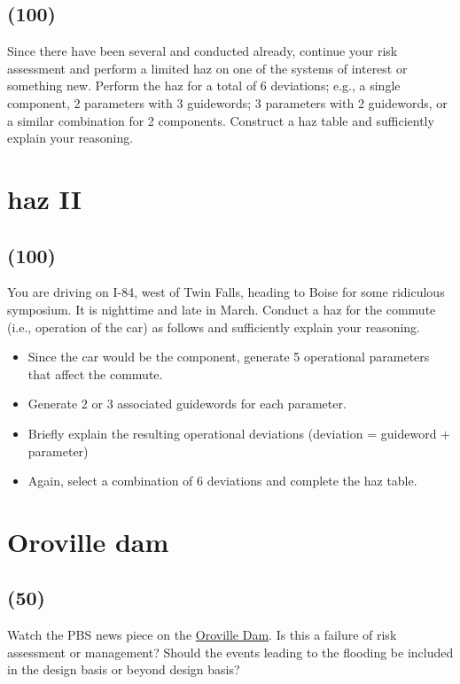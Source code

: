 \documentclass[11pt,a4paper]{article}
\newcommand{\acs}{\acrshort} %
\newcommand{\acsp}{\acrshortpl} %
\begin{document}
\subsection*{(100)}
Since there have been several \acsp{pha} and \acsp{fma} conducted already, continue your risk assessment and perform a limited \acs{haz} on one of the systems of interest or something new. Perform the \acs{haz} for a total of 6 deviations; e.g., a single component, 2 parameters with 3 guidewords; 3 parameters with 2 guidewords, or a similar combination for 2 components. Construct a \acs{haz} table and sufficiently explain your reasoning.





\newpage

\section{\acs{haz} II}
\subsection*{(100)}
You are driving on I-84, west of Twin Falls, heading to Boise for some ridiculous symposium. It is nighttime and late in March. Conduct a \acs{haz} for the commute (i.e., operation of the car) as follows and sufficiently explain your reasoning.
\begin{itemize}
    \item Since the car would be the component, generate 5 operational parameters that affect the commute.
    \item Generate 2 or 3 associated guidewords for each parameter.
    \item Briefly explain the resulting operational deviations (deviation = guideword + parameter)
    \item Again, select a combination of 6 deviations and complete the \acs{haz} table.
\end{itemize}





\newpage
        
\section{Oroville dam}
\subsection*{(50)}
Watch the PBS news piece on the \href{https://youtu.be/Quh6fX57YxY}{Oroville Dam}. Is this a failure of risk assessment or management? Should the events leading to the flooding be included in the design basis or beyond design basis?
\end{document}
